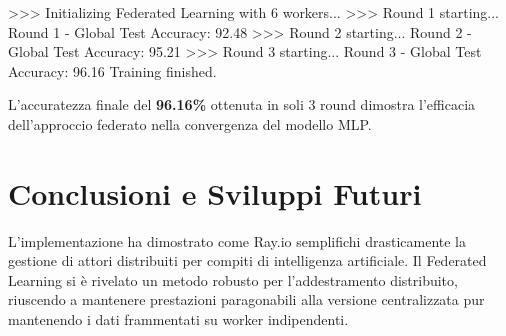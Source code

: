 \documentclass[a4paper,12pt]{article}
\begin{document}
\begin{terminal}
>>> Initializing Federated Learning with 6 workers...
>>> Round 1 starting...
Round 1 - Global Test Accuracy: 92.48%
>>> Round 2 starting...
Round 2 - Global Test Accuracy: 95.21%
>>> Round 3 starting...
Round 3 - Global Test Accuracy: 96.16%
Training finished.
\end{terminal}

L'accuratezza finale del \textbf{96.16\%} ottenuta in soli 3 round dimostra l'efficacia dell'approccio federato nella convergenza del modello MLP.

\section{Conclusioni e Sviluppi Futuri}
L'implementazione ha dimostrato come Ray.io semplifichi drasticamente la gestione di attori distribuiti per compiti di intelligenza artificiale. Il Federated Learning si è rivelato un metodo robusto per l'addestramento distribuito, riuscendo a mantenere prestazioni paragonabili alla versione centralizzata pur mantenendo i dati frammentati su worker indipendenti.
\end{document}
